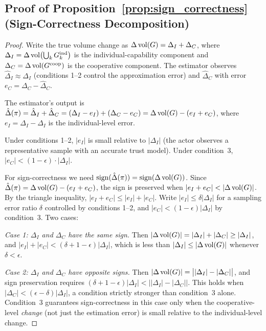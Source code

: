 \subsection{Proof of Proposition~\ref{prop:sign_correctness} (Sign-Correctness Decomposition)}
\label{app:proof_sign_correctness}

\begin{proof}
Write the true volume change as
$\Delta \operatorname{vol}(G) = \Delta_I + \Delta_C$, where
$\Delta_I = \Delta \operatorname{vol}\bigl(\bigcup_k G_{k}^{\mathrm{ind}}\bigr)$ is the
individual-capability component and $\Delta_C = \Delta \operatorname{vol}(G^{\mathrm{coop}})$ is the
cooperative component. The estimator observes
$\hat{\Delta}_I \approx \Delta_I$ (conditions 1--2 control the approximation
error) and $\hat{\Delta}_C$ with error
$e_C = \Delta_C - \hat{\Delta}_C$.

The estimator's output is
$\hat{\Delta}(\pi) = \hat{\Delta}_I + \hat{\Delta}_C
= (\Delta_I - e_I) + (\Delta_C - e_C)
= \Delta \operatorname{vol}(G) - (e_I + e_C)$,
where $e_I = \Delta_I - \hat{\Delta}_I$ is the individual-level error.

Under conditions 1--2, $|e_I|$ is small relative to $|\Delta_I|$ (the actor
observes a representative sample with an accurate trust model). Under
condition~3, $|e_C| < (1 - \epsilon) \cdot |\Delta_I|$.

For sign-correctness we need $\operatorname{sign}(\hat{\Delta}(\pi)) = \operatorname{sign}(\Delta \operatorname{vol}(G))$.
Since $\hat{\Delta}(\pi) = \Delta \operatorname{vol}(G) - (e_I + e_C)$, the sign is preserved
when $|e_I + e_C| < |\Delta \operatorname{vol}(G)|$. By the triangle inequality,
$|e_I + e_C| \leq |e_I| + |e_C|$. Write $|e_I| \leq \delta |\Delta_I|$ for
a sampling error ratio $\delta$ controlled by conditions 1--2, and
$|e_C| < (1-\epsilon) |\Delta_I|$ by condition~3. Two cases:

\emph{Case 1: $\Delta_I$ and $\Delta_C$ have the same sign.} Then
$|\Delta \operatorname{vol}(G)| = |\Delta_I| + |\Delta_C| \geq |\Delta_I|$, and
$|e_I| + |e_C| < (\delta + 1 - \epsilon)|\Delta_I|$, which is less than
$|\Delta_I| \leq |\Delta \operatorname{vol}(G)|$ whenever $\delta < \epsilon$.

\emph{Case 2: $\Delta_I$ and $\Delta_C$ have opposite signs.} Then
$|\Delta \operatorname{vol}(G)| = \bigl||\Delta_I| - |\Delta_C|\bigr|$, and sign
preservation requires $(\delta + 1 - \epsilon)|\Delta_I| <
\bigl||\Delta_I| - |\Delta_C|\bigr|$. This holds when
$|\Delta_C| < (\epsilon - \delta)|\Delta_I|$, a condition strictly stronger
than condition~3 alone. Condition~3 guarantees sign-correctness in this case
only when the cooperative-level \emph{change} (not just the estimation error)
is small relative to the individual-level change.
\end{proof}

